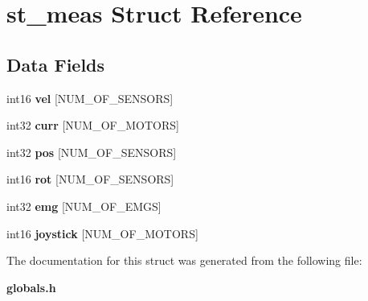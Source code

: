 \section{st\+\_\+meas Struct Reference}
\label{structst__meas}
\subsection*{Data Fields}
\begin{DoxyCompactItemize}
\item 
\mbox{\label{structst__meas_ad77c8d1a6800fe7da9ebed5c54a1e3b5}} 
int16 {\bfseries vel} [N\+U\+M\+\_\+\+O\+F\+\_\+\+S\+E\+N\+S\+O\+RS]
\item 
\mbox{\label{structst__meas_a035463484308a2613b907a0cbaa4047c}} 
int32 {\bfseries curr} [N\+U\+M\+\_\+\+O\+F\+\_\+\+M\+O\+T\+O\+RS]
\item 
\mbox{\label{structst__meas_a3ee4913e7257d25d3e47cbbada9c8546}} 
int32 {\bfseries pos} [N\+U\+M\+\_\+\+O\+F\+\_\+\+S\+E\+N\+S\+O\+RS]
\item 
\mbox{\label{structst__meas_ac51933e869c17d7d041bcf80dfb571ab}} 
int16 {\bfseries rot} [N\+U\+M\+\_\+\+O\+F\+\_\+\+S\+E\+N\+S\+O\+RS]
\item 
\mbox{\label{structst__meas_a3d1b5e40ddbb5e34307f6b8e9cc116ff}} 
int32 {\bfseries emg} [N\+U\+M\+\_\+\+O\+F\+\_\+\+E\+M\+GS]
\item 
\mbox{\label{structst__meas_aabc0b6873e834fd66cecc830c9b39ef3}} 
int16 {\bfseries joystick} [N\+U\+M\+\_\+\+O\+F\+\_\+\+M\+O\+T\+O\+RS]
\end{DoxyCompactItemize}


The documentation for this struct was generated from the following file\+:\begin{DoxyCompactItemize}
\item 
\textbf{ globals.\+h}\end{DoxyCompactItemize}
